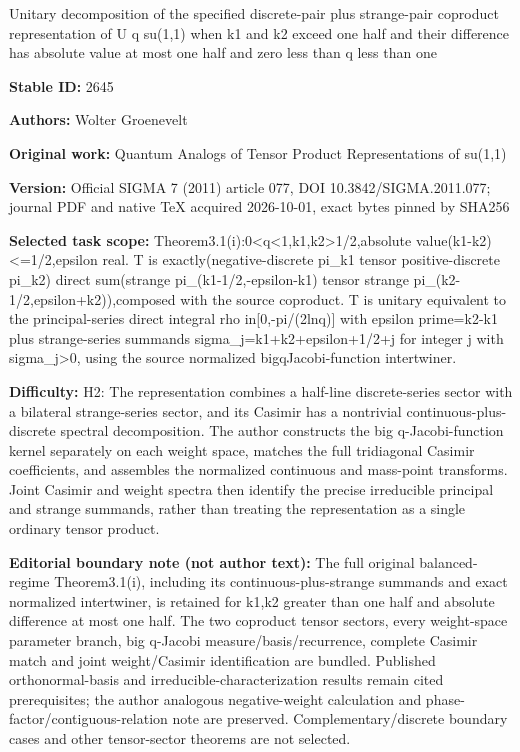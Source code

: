 \documentclass[11pt]{article}
\numberwithin{equation}{section}
\numberwithin{theorem}{section}
\numberwithin{proposition}{section}
\numberwithin{lemma}{section}
\numberwithin{corollary}{section}
\numberwithin{definition}{section}
\numberwithin{example}{section}
\numberwithin{remark}{section}
\numberwithin{note}{section}
\begin{document}
\begin{center}\Large Unitary decomposition of the specified discrete-pair plus strange-pair coproduct representation of U q su(1,1) when k1 and k2 exceed one half and their difference has absolute value at most one half and zero less than q less than one\end{center}
\noindent\textbf{Stable ID:} 2645\par
\noindent\textbf{Authors:} Wolter Groenevelt\par
\noindent\textbf{Original work:} Quantum Analogs of Tensor Product Representations of su(1,1)\par
\noindent\textbf{Version:} Official SIGMA 7 (2011) article 077, DOI 10.3842/SIGMA.2011.077; journal PDF and native TeX acquired 2026-10-01, exact bytes pinned by SHA256\par
\noindent\textbf{Selected task scope:} Theorem3.1(i):0<q<1,k1,k2>1/2,absolute value(k1-k2)<=\allowbreak{}1/2,epsilon real. T is exactly(negative-discrete pi\_k1 tensor positive-discrete pi\_k2) direct sum(strange pi\_(k1-1/2,-epsilon-k1) tensor strange pi\_(k2-1/2,epsilon+\allowbreak{}k2)),composed with the source coproduct. T is unitary equivalent to the principal-series direct integral rho in[0,-pi/(2lnq)] with epsilon prime=\allowbreak{}k2-k1 plus strange-series summands sigma\_j=\allowbreak{}k1+\allowbreak{}k2+\allowbreak{}epsilon+\allowbreak{}1/2+\allowbreak{}j for integer j with sigma\_j>0, using the source normalized bigqJacobi-function intertwiner.\par
\noindent\textbf{Difficulty:} H2: The representation combines a half-line discrete-series sector with a bilateral strange-series sector, and its Casimir has a nontrivial continuous-plus-discrete spectral decomposition. The author constructs the big q-Jacobi-function kernel separately on each weight space, matches the full tridiagonal Casimir coefficients, and assembles the normalized continuous and mass-point transforms. Joint Casimir and weight spectra then identify the precise irreducible principal and strange summands, rather than treating the representation as a single ordinary tensor product.\par
\noindent\textbf{Editorial boundary note (not author text):} The full original balanced-regime Theorem3.1(i), including its continuous-plus-strange summands and exact normalized intertwiner, is retained for k1,k2 greater than one half and absolute difference at most one half. The two coproduct tensor sectors, every weight-space parameter branch, big q-Jacobi measure/basis/recurrence, complete Casimir match and joint weight/Casimir identification are bundled. Published orthonormal-basis and irreducible-characterization results remain cited prerequisites; the author analogous negative-weight calculation and phase-factor/contiguous-relation note are preserved. Complementary/discrete boundary cases and other tensor-sector theorems are not selected.\par
\end{document}
